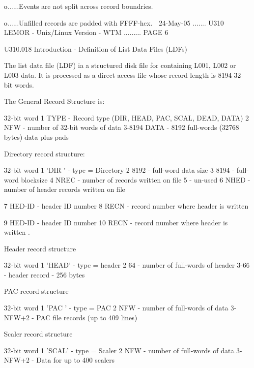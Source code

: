  
   o......Events are not split across record boundries.
 
   o......Unfilled records are padded with FFFF-hex.
    
   24-May-05 ....... U310  LEMOR - Unix/Linux Version - WTM ......... PAGE   6
 
   U310.018  Introduction - Definition of List Data Files (LDFs)
 
   The list data file (LDF) ia a structured disk  file  for  containing  L001,
   L002  or  L003  data.  It is processed as a direct access file whose record
   length is 8194 32-bit words.
 
   The General Record Structure is:
 
   32-bit word  1       TYPE  - Record type (DIR, HEAD, PAC, SCAL, DEAD, DATA)
                2       NFW   - number of 32-bit words of data
                3-8194  DATA  - 8192 full-words (32768 bytes) data plus pads
 
   Directory record structure:
 
   32-bit word  1       'DIR '  - type = Directory
                2       8192    - full-word data size
                3       8194    - full-word blocksize
                4       NREC    - number of records written on file
                5               - un-used
                6       NHED    - number of header records written on file
 
                7       HED-ID  - header ID number
                8       RECN    - record number where header is written
 
                9       HED-ID  - header ID number
               10       RECN    - record number where header is written
                .
 
   Header record structure
 
   32-bit word  1       'HEAD'  - type = header
                2        64     - number of full-words of header
                3-66            - header record - 256 bytes
 
   PAC record structure
 
   32-bit word  1       'PAC '  - type = PAC
                2        NFW    - number of full-words of data
                3-NFW+2         - PAC file records (up to 409 lines)
 
   Scaler record structure
 
   32-bit word  1       'SCAL'  - type = Scaler
                2        NFW    - number of full-words of data
                3-NFW+2         - Data for up to 400 scalers
 
